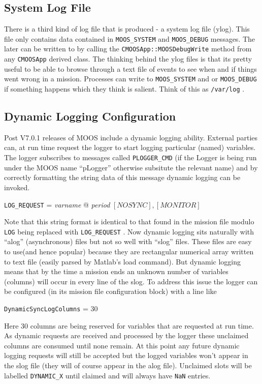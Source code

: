 \documentclass[a4paper,10pt]{article}
\newcommand{\Code}[1]{\texttt{#1} }
\newcommand{\code}[1]{\Code{#1} }
\begin{document}
\subsection{System Log File}
There is a third kind of log file that is produced - a system log file (ylog). This file only contains
data contained in \code{MOOS\_SYSTEM} and \code{MOOS\_DEBUG} messages. The later can be written to by calling the \code{CMOOSApp::MOOSDebugWrite} method from any \code{CMOOSApp} derived class. The thinking behind the ylog files is that its pretty useful to be able to browse through
a text file of events to see when and if things went wrong in a mission. Processes can write to \code{MOOS\_SYSTEM} and or \code{MOOS\_DEBUG} if something happens which they think is salient. Think of this as \code{/var/log}.


\subsection{Dynamic Logging Configuration}
Post V7.0.1 releases of MOOS include a dynamic logging ability. External parties can, at run time request the logger to start logging
particular (named) variables. The logger subscribes to messages called \code{PLOGGER\_CMD} (if the Logger is being run under the MOOS name ``pLogger'' otherwise subsitute the relevant name) and by correctly formatting the string data of this message dynamic logging can be invoked.

\begin{center}
\code{LOG\_REQUEST} =  {\it{varname}} @ {\it{period}} $[NOSYNC],[MONITOR]$
\end{center}

Note that this string format is identical to that found in the mission file modulo \code{LOG} being replaced with \code{LOG\_REQUEST}. Now dynamic logging sits naturally with ``alog'' (asynchronous) files but not so well with ``slog'' files. These files are easy to use(and hence popular)  because they are rectangular numerical array written to text file (easily parsed by Matlab's load command). But dynamic logging means that by the time a mission ends an unknown number of variables (columns) will occur in every line of the slog. To address this issue the logger can be configured (in its mission file configuration block) with a line like

\begin{center}
\code{DynamicSyncLogColumns} =  30
\end{center}

Here 30 columns are being reserved for variables that are requested at run time. As dynamic requests are received and processed by the logger these unclaimed columns are consumed until none remain. At this point any future dynamic logging requests will still be accepted but the logged variables won't appear in the slog file (they will of course appear in the alog file). Unclaimed slots will be labelled \code{DYNAMIC\_X} until claimed and will always have \code{NaN} entries.
\end{document}

